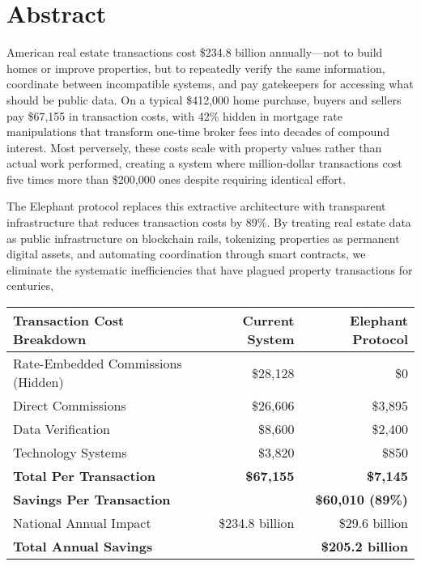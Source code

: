\chapter{Abstract}

American real estate transactions cost \$234.8 billion annually—not to build homes or improve properties, but to repeatedly verify the same information, coordinate between incompatible systems, and pay gatekeepers for accessing what should be public data. On a typical \$412,000 home purchase, buyers and sellers pay \$67,155 in transaction costs, with 42\% hidden in mortgage rate manipulations that transform one-time broker fees into decades of compound interest. Most perversely, these costs scale with property values rather than actual work performed, creating a system where million-dollar transactions cost five times more than \$200,000 ones despite requiring identical effort.

The Elephant protocol replaces this extractive architecture with transparent infrastructure that reduces transaction costs by 89\%. By treating real estate data as public infrastructure on blockchain rails, tokenizing properties as permanent digital assets, and automating coordination through smart contracts, we eliminate the systematic inefficiencies that have plagued property transactions for centuries,

\begin{table}[h]
\centering
\begin{tabular}{lrr}
\hline
\textbf{Transaction Cost Breakdown} & \textbf{Current System} & \textbf{Elephant Protocol} \\
\hline
Rate-Embedded Commissions (Hidden) & \$28,128 & \$0 \\
Direct Commissions & \$26,606 & \$3,895 \\
Data Verification & \$8,600 & \$2,400 \\
Technology Systems & \$3,820 & \$850 \\
\hline
\textbf{Total Per Transaction} & \textbf{\$67,155} & \textbf{\$7,145} \\
\textbf{Savings Per Transaction} & & \textbf{\$60,010 (89\%)} \\
\hline
National Annual Impact & \$234.8 billion & \$29.6 billion \\
\textbf{Total Annual Savings} & & \textbf{\$205.2 billion} \\
\hline
\end{tabular}
\end{table}

